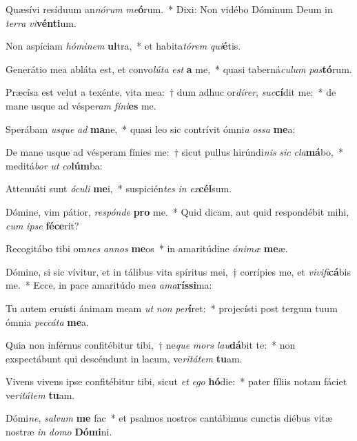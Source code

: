 \item Quæsívi resíduum an\textit{nó}\textit{rum} \textit{me}\textbf{ó}rum.~* Dixi: Non vidébo Dóminum Deum in \textit{ter}\textit{ra} \textit{vi}\textbf{vén}\textbf{ti}um.
\item Non aspíciam \textit{hó}\textit{mi}\textit{nem} \textbf{ul}tra,~* et habita\textit{tó}\textit{rem} \textit{qui}\textbf{é}tis.
\item Generátio mea abláta est, et convo\textit{lú}\textit{ta} \textit{est} \textbf{a} me,~* quasi taberná\textit{cu}\textit{lum} \textit{pas}\textbf{tó}rum.
\item Præcísa est velut a texénte, vita mea:~† dum adhuc or\textit{dí}\textit{rer}, \textit{suc}\textbf{cí}dit me:~* de mane usque ad véspe\textit{ram} \textit{fí}\textit{ni}\textbf{es} me.
\item Sperábam \textit{us}\textit{que} \textit{ad} \textbf{ma}ne,~* quasi leo sic contrívit ómni\textit{a} \textit{os}\textit{sa} \textbf{me}a:
\item De mane usque ad vésperam fínies me:~† sicut pullus hirúndi\textit{nis} \textit{sic} \textit{cla}\textbf{má}bo,~* meditá\textit{bor} \textit{ut} \textit{co}\textbf{lúm}ba:
\item Attenuáti sunt \textit{ó}\textit{cu}\textit{li} \textbf{me}i,~* suspicién\textit{tes} \textit{in} \textit{ex}\textbf{cél}sum.
\item Dómine, vim pátior, \textit{re}\textit{spón}\textit{de} \textbf{pro} me.~* Quid dicam, aut quid respondébit mihi, \textit{cum} \textit{ip}\textit{se} \textbf{fé}\textbf{ce}rit?
\item Recogitábo tibi om\textit{nes} \textit{an}\textit{nos} \textbf{me}os~* in amaritúdine \textit{á}\textit{ni}\textit{mæ} \textbf{me}æ.
\item Dómine, si sic vívitur, et in tálibus vita spíritus mei,~† corrípies me, et \textit{vi}\textit{vi}\textit{fi}\textbf{cá}bis me.~* Ecce, in pace amaritúdo me\textit{a} \textit{a}\textit{ma}\textbf{rís}\textbf{si}ma:
\item Tu autem eruísti ánimam meam \textit{ut} \textit{non} \textit{per}\textbf{í}ret:~* projecísti post tergum tuum ómnia \textit{pec}\textit{cá}\textit{ta} \textbf{me}a.
\item Quia non inférnus confitébitur tibi,~† ne\textit{que} \textit{mors} \textit{lau}\textbf{dá}bit te:~* non exspectábunt qui descéndunt in lacum, ve\textit{ri}\textit{tá}\textit{tem} \textbf{tu}am.
\item Vivens vivens ipse confitébitur tibi, sicut \textit{et} \textit{e}\textit{go} \textbf{hó}die:~* pater fíliis notam fáciet ve\textit{ri}\textit{tá}\textit{tem} \textbf{tu}am.
\item Dómi\textit{ne}, \textit{sal}\textit{vum} \textbf{me} fac~* et psalmos nostros cantábimus cunctis diébus vitæ nostræ \textit{in} \textit{do}\textit{mo} \textbf{Dó}\textbf{mi}ni.
